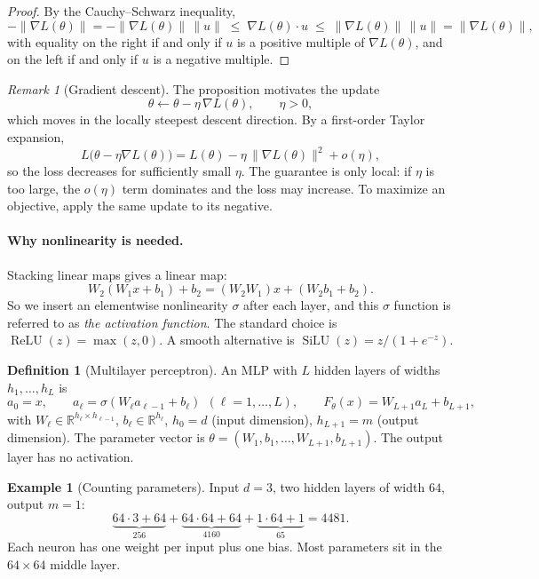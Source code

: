\documentclass[11pt]{article}
\theoremstyle{definition}
\newtheorem{definition}[theorem]{Definition}
\newtheorem{example}[theorem]{Example}
\theoremstyle{remark}
\newtheorem{remark}[theorem]{Remark}
\newcommand{\R}{\mathbb{R}}
\newcommand{\relu}{\operatorname{ReLU}}
\begin{document}
\begin{proof}
By the Cauchy--Schwarz inequality,
\[
-\|\nabla L(\theta)\|=-\|\nabla L(\theta)\|\,\|u\|\;\le\;\nabla L(\theta)\cdot u\;\le\;\|\nabla L(\theta)\|\,\|u\|=\|\nabla L(\theta)\|,
\]
with equality on the right if and only if $u$ is a positive multiple of $\nabla L(\theta)$, and on the left if and only if $u$ is a negative multiple. \qedhere
\end{proof}

\begin{remark}[Gradient descent]
The proposition motivates the update
\[
\theta\leftarrow\theta-\eta\,\nabla L(\theta),\qquad \eta>0,
\]
which moves in the locally steepest descent direction. By a first-order Taylor expansion,
\[
L\bigl(\theta-\eta\nabla L(\theta)\bigr)=L(\theta)-\eta\,\|\nabla L(\theta)\|^2+o(\eta),
\]
so the loss decreases for sufficiently small $\eta$. The guarantee is only local: if $\eta$ is too large, the $o(\eta)$ term dominates and the loss may increase. To maximize an objective, apply the same update to its negative.
\end{remark}
\paragraph{Why nonlinearity is needed.} Stacking linear maps gives a linear map:
\[
W_2(W_1x+b_1)+b_2=(W_2W_1)x+(W_2b_1+b_2).
\]
So we insert an elementwise nonlinearity $\sigma$ after each layer, and this $\sigma$ function is referred to as \textit{the activation function}. The standard choice is
$\relu(z)=\max(z,0)$. A smooth alternative is $\operatorname{SiLU}(z)=z/(1+e^{-z})$.

\begin{definition}[Multilayer perceptron]
An MLP with $L$ hidden layers of widths $h_1,\dots,h_L$ is
\[
a_0=x,\qquad a_\ell=\sigma(W_\ell a_{\ell-1}+b_\ell)\ \ (\ell=1,\dots,L),\qquad F_\theta(x)=W_{L+1}a_L+b_{L+1},
\]
with $W_\ell\in\R^{h_\ell\times h_{\ell-1}}$, $b_\ell\in\R^{h_\ell}$, $h_0=d$ (input dimension), $h_{L+1}=m$ (output dimension).
The parameter vector is $\theta=(W_1,b_1,\dots,W_{L+1},b_{L+1})$. The output layer has no activation.
\end{definition}

\begin{example}[Counting parameters]
Input $d=3$, two hidden layers of width $64$, output $m=1$:
\[
\underbrace{64\cdot3+64}_{256}+\underbrace{64\cdot64+64}_{4160}+\underbrace{1\cdot64+1}_{65}=4481 .
\]
Each neuron has one weight per input plus one bias. Most parameters sit in the $64\times64$ middle layer.
\end{example}
\end{document}
